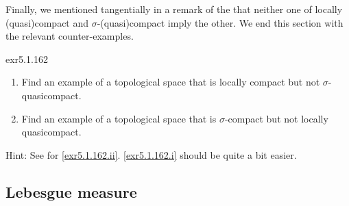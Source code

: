 Finally, we mentioned tangentially in a remark of the  that neither one of locally (quasi)compact and $\sigma$-(quasi)compact imply the other.  We end this section with the relevant counter-examples.
\begin{exr}{}{exr5.1.162}
\begin{enumerate}
\item \label{exr5.1.162.i}Find an example of a topological space that is locally compact but not $\sigma$-quasicompact.
\item \label{exr5.1.162.ii}Find an example of a topological space that is $\sigma$-compact but not locally quasicompact.
\end{enumerate}
\begin{rmk}
Hint:  See \cite[58]{Steen} for \cref{exr5.1.162.ii}.  \cref{exr5.1.162.i} should be quite a bit easier.
\end{rmk}
\end{exr}

\subsection{Lebesgue measure}

